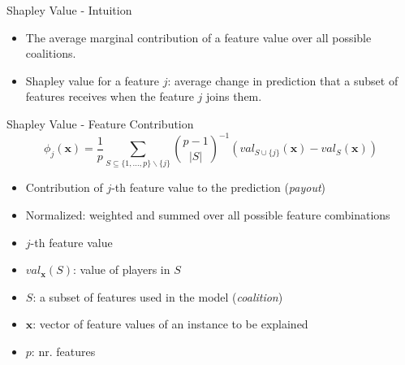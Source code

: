 \begin{frame}{Shapley Value - Intuition}
	\begin{itemize}\setlength\itemsep{4em}
		\item The average marginal contribution of a feature value over all possible coalitions.
		\item Shapley value for a feature $j$: average change in prediction that a subset of features receives when the feature $j$ joins them.
	\end{itemize}
\end{frame}
\begin{frame}{Shapley Value - Feature Contribution}
\begin{equation}
	\phi_j(\bm{x})=\frac{1}{p}\sum_{S\subseteq\{1,\ldots,p\} \backslash \{j\}}\binom{p-1}{|S|}^{-1}\left(val_{S\cup\{j\}}(\bm{x})-val_S(\bm{x})\right)
\end{equation}
\begin{itemize}
	\item Contribution of $j$-th feature value to the prediction (\emph{payout})
	\item Normalized: weighted and summed over all possible feature combinations
	\item $j$-th feature value
	\item $val_{\bm{x}}(S)$: value of players in $S$ %
	\item $S$: a subset of features used in the model (\emph{coalition})
	\item $\bm{x}$: vector of feature values of an instance to be explained
	\item $p$: nr. features
\end{itemize}
\end{frame}



